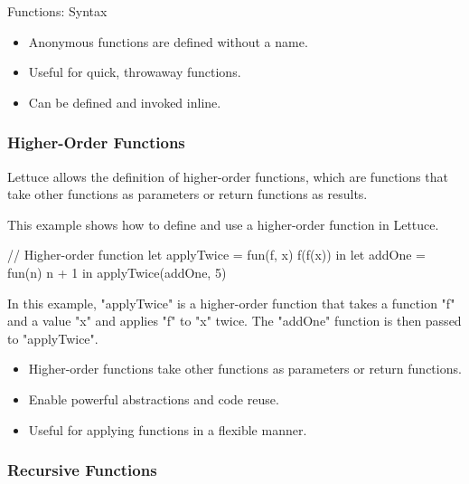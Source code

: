 \begin{notes}{Functions: Syntax}
\begin{highlight}
        \begin{itemize}
            \item Anonymous functions are defined without a name.
            \item Useful for quick, throwaway functions.
            \item Can be defined and invoked inline.
        \end{itemize}
    
    \end{highlight}
    
    \subsubsection*{Higher-Order Functions}
    
    Lettuce allows the definition of higher-order functions, which are functions that take other functions as parameters or return functions as results.
    
    \begin{highlight}
    
        This example shows how to define and use a higher-order function in Lettuce.
    
    \begin{code}[Lettuce]
    // Higher-order function
    let applyTwice = fun(f, x) {
        f(f(x))
    } in
    let addOne = fun(n) {
        n + 1
    } in
    applyTwice(addOne, 5)
    \end{code}
    
        In this example, "applyTwice" is a higher-order function that takes a function "f" and a value "x" and applies "f" to "x" twice. The "addOne" function is then passed to "applyTwice".
    
        \begin{itemize}
            \item Higher-order functions take other functions as parameters or return functions.
            \item Enable powerful abstractions and code reuse.
            \item Useful for applying functions in a flexible manner.
        \end{itemize}
    
    \end{highlight}
    
    \subsubsection*{Recursive Functions}
    

\end{notes}
